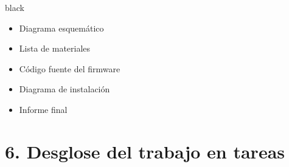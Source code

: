 \documentclass[11pt]{charter}
\begin{document}
\begin{consigna}{black}
\begin{itemize}
\item Diagrama esquemático
\item Lista de materiales
\item Código fuente del firmware
\item Diagrama de instalación
\item Informe final

\end{itemize}

\end{consigna}

\section{6. Desglose del trabajo en tareas}
\label{sec:wbs}
\end{document}
